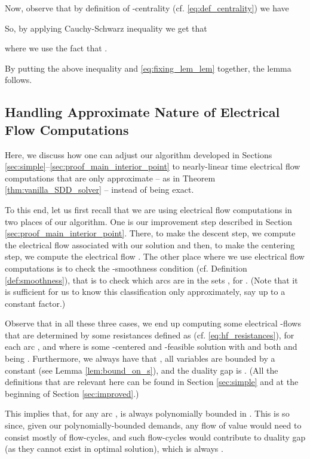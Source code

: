 \documentclass[11pt, letterpaper]{article}
\begin{document}
Now, observe that by definition of -centrality (cf. \eqref{eq:def_centrality}) we have

So, by applying Cauchy-Schwarz inequality we get that

where we use the fact that . 

By putting the above inequality and \eqref{eq:fixing_lem_lem} together, the lemma follows.


 

\subsection{Handling Approximate Nature of Electrical Flow Computations}\label{app:inexact_elec_flow_disc}



Here, we discuss how one can adjust our algorithm developed in Sections \ref{sec:simple}--\ref{sec:proof_main_interior_point} to nearly-linear time electrical flow computations that are only approximate -- as in Theorem \ref{thm:vanilla_SDD_solver} -- instead of being exact. 

To this end, let us first recall that we are using electrical flow computations in two places of our algorithm. One is our improvement step described in Section \ref{sec:proof_main_interior_point}. There, to make the descent step, we compute the electrical flow  associated with our solution and then, to make the centering step, we compute the electrical flow . The other place where we use electrical flow computations is to check the -smoothness condition (cf. Definition \ref{def:smoothness}), that is to check which arcs are in the sets , for . (Note that it is sufficient for us to know this classification only approximately, say up to a constant factor.)

Observe that in all these three cases, we end up computing some electrical -flows that are determined by some resistances  defined as  (cf. \eqref{eq:hf_resistances}), for each arc , and where  is some -centered and -feasible solution  with  and both  and  being . Furthermore, we always have that , all variables  are bounded by a constant (see Lemma \ref{lem:bound_on_s}), and the duality gap is . (All the definitions that are relevant here can be found in Section \ref{sec:simple} and at the beginning of Section \ref{sec:improved}.)

This implies that, for any arc ,  is always polynomially bounded in . This is so since, given our polynomially-bounded demands, any flow of value  would need to consist mostly of flow-cycles, and such flow-cycles would contribute to duality gap (as they cannot exist in optimal solution), which is always . 
\end{document}
